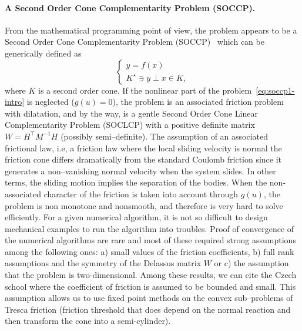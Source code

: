 

\paragraph{A Second Order Cone Complementarity Problem (SOCCP).}
From the mathematical programming point of view, the problem appears to be a Second Order Cone Complementarity Problem (SOCCP)~\cite{Facchinei.Pang2003} which can be generically defined as
\begin{equation}
  \begin{cases}
    y =f(x) \\
    K^\star \ni y \perp x \in K,
  \end{cases}
\end{equation}
where $K$ is a second order cone. If the nonlinear part of the problem~\eqref{eq:soccp1-intro} is neglected ($g(u)=0$), the problem is an associated friction problem with dilatation, and by the way, is a gentle Second Order Cone Linear Complementarity Problem (SOCLCP) with a positive definite matrix $W = H^\top M^{-1} H$ (possibly semi--definite). {The assumption of an associated frictional law, i.e, a friction law where the local sliding velocity is normal the friction cone differs dramatically from the standard Coulomb friction since it generates a non--vanishing normal velocity when the system slides. In other terms, the sliding motion implies the separation of the bodies.}
When the non-associated character of the friction is taken into account through $g(u)$, the problem is non monotone and nonsmooth, and therefore is very hard to solve efficiently. For a given numerical algorithm, it is not so difficult to design mechanical examples to run the algorithm into troubles.
{Proof of convergence} of the numerical algorithms are rare and most of these required strong assumptions among the following ones: a) small values of the friction coefficients, b) full rank assumptions and the symmetry of the Delassus matrix $W$ or c) the assumption that the problem is two-dimensional. Among these results, we can cite the Czech school where the coefficient of friction is assumed to be bounded and small. This assumption allows us to use fixed point methods on the convex sub--problems of Tresca friction {(friction threshold that does depend on the normal reaction and then transform the cone into a semi-cylinder)}.
